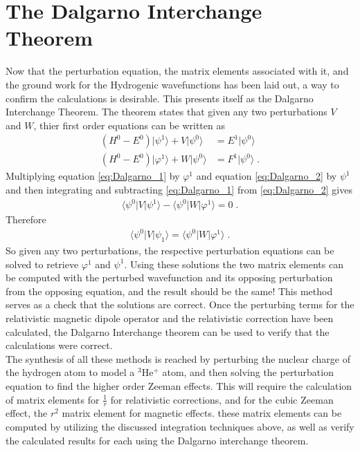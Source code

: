     \section{The Dalgarno Interchange Theorem} \label{sec:Dalgarno_Interchange_Theorem}
        Now that the perturbation equation, the matrix elements associated with it, and the ground work for the Hydrogenic wavefunctions has been laid out, a way to confirm the calculations is desirable. This presents itself as the Dalgarno Interchange Theorem. The theorem states that given any two perturbations $V$ and $W$, thier first order equations can be written as
        \begin{align}
            \left( H^0 - E^0 \right) \vert\psi^1\rangle + V \vert\psi^0\rangle &= E^1 \vert \psi^0\rangle \label{eq:Dalgarno_1}\\
            \left( H^0 - E^0 \right) \vert \varphi^1 \rangle + W \vert \psi^0\rangle &= F^1 \vert \psi^0 \rangle \label{eq:Dalgarno_2}\;.
        \end{align}
        \noindent Multiplying equation \eqref{eq:Dalgarno_1} by $\varphi^1$ and equation \eqref{eq:Dalgarno_2} by $\psi^1$ and then integrating and subtracting \eqref{eq:Dalgarno_1} from \eqref{eq:Dalgarno_2} gives
        \begin{align}
            \langle \psi^0 \vert V \vert \psi^1 \rangle - \langle \psi^0 \vert W \vert \varphi^1 \rangle = 0\;.
        \end{align}
        \noindent Therefore 
        \begin{align}
            \langle \psi^0 \vert V \vert \psi_1 \rangle = \langle \psi^0 \vert W \vert \varphi^1 \rangle\;.
        \end{align}
        \noindent So given any two perturbations, the respective perturbation equations can be solved to retrieve $\varphi^1$ and $\psi^1$. Using these solutions the two matrix elements can be computed with the perturbed wavefunction and its opposing perturbation from the opposing equation, and the result should be the same! This method serves as a check that the solutions are correct. Once the perturbing terms for the relativistic magnetic dipole operator and the relativistic correction have been calculated, the Dalgarno Interchange theorem can be used to verify that the calculations were correct.\\

        The synthesis of all these methods is reached by perturbing the nuclear charge of the hydrogen atom to model a $^3$He$^+$ atom, and then solving the perturbation equation to find the higher order Zeeman effects. This will require the calculation of matrix elements for $\frac{1}{r}$ for relativistic corrections, and for the cubic Zeeman effect, the $r^2$ matrix element for magnetic effects. these matrix elements can be computed by utilizing the discussed integration techniques above, as well as verify the calculated results for each using the Dalgarno interchange theorem.
    
